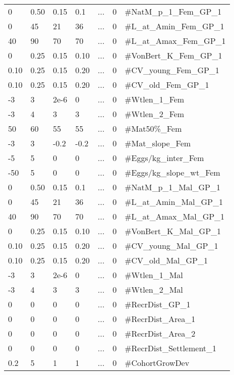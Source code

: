 \begin{center}
\begin{longtable}{p{1.1cm} p{1.1cm} p{1.1cm}  p{1.1cm}  p{1.1cm}  p{1.1cm}  p{8cm}  }
		0    & 0.50 & 0.15 & 0.1  & ... & 0 & \#NatM\_p\_1\_Fem\_GP\_1\\
		0    & 45   & 21   & 36   & ... & 0 & \#L\_at\_Amin\_Fem\_GP\_1 \\
		40   & 90   & 70   & 70   & ... & 0 & \#L\_at\_Amax\_Fem\_GP\_1 \\
		0    & 0.25 & 0.15 & 0.10 & ... & 0 & \#VonBert\_K\_Fem\_GP\_1 \\
		0.10 & 0.25 & 0.15 & 0.20 & ... & 0 & \#CV\_young\_Fem\_GP\_1 \\
		0.10 & 0.25 & 0.15 & 0.20 & ... & 0 & \#CV\_old\_Fem\_GP\_1 \\
		-3   & 3    & 2e-6 & 0    & ... & 0 & \#Wtlen\_1\_Fem \\
		-3   & 4    & 3    & 3    & ... & 0 & \#Wtlen\_2\_Fem \\
		50   & 60   & 55   & 55   & ... & 0 & \#Mat50\%\_Fem  \\
		-3   & 3    & -0.2 & -0.2 & ... & 0 & \#Mat\_slope\_Fem \\
		-5   & 5    & 0    & 0    & ... & 0 & \#Eggs/kg\_inter\_Fem \\
		-50  & 5    & 0    & 0    & ... & 0 & \#Eggs/kg\_slope\_wt\_Fem \\
		0    & 0.50 & 0.15 & 0.1  & ... & 0 & \#NatM\_p\_1\_Mal\_GP\_1\\
		0    & 45   & 21   & 36   & ... & 0 & \#L\_at\_Amin\_Mal\_GP\_1 \\
		40   & 90   & 70   & 70   & ... & 0 & \#L\_at\_Amax\_Mal\_GP\_1 \\
		0    & 0.25 & 0.15 & 0.10 & ... & 0 & \#VonBert\_K\_Mal\_GP\_1 \\
		0.10 & 0.25 & 0.15 & 0.20 & ... & 0 & \#CV\_young\_Mal\_GP\_1 \\
		0.10 & 0.25 & 0.15 & 0.20 & ... & 0 & \#CV\_old\_Mal\_GP\_1 \\
		-3   & 3    & 2e-6 & 0    & ... & 0 & \#Wtlen\_1\_Mal \\
		-3   & 4    & 3    & 3    & ... & 0 & \#Wtlen\_2\_Mal \\
		 0   & 0    & 0    & 0    & ... & 0 & \#RecrDist\_GP\_1 \\
		 0   & 0    & 0    & 0    & ... & 0 & \#RecrDist\_Area\_1 \\
		 0   & 0    & 0    & 0    & ... & 0 & \#RecrDist\_Area\_2 \\
		 0   & 0    & 0    & 0    & ... & 0 & \#RecrDist\_Settlement\_1 \\
		 0.2 & 5    & 1    & 1    & ... & 0 & \#CohortGrowDev \\

\end{longtable}
\end{center}
